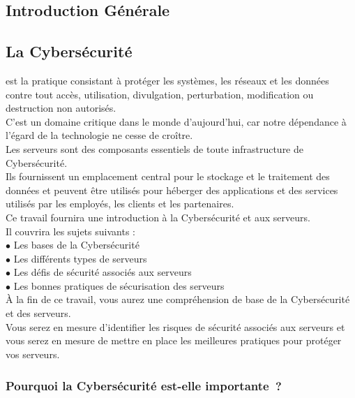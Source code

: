 	\begin{Huge}
		\chapter{ Introduction Générale}
	\end{Huge}
 \paragraph{ }
\section{La Cybersécurité }
 est la pratique consistant à protéger les systèmes, les réseaux et les données contre tout accès, utilisation, divulgation, perturbation, modification ou destruction non autorisés.\\
 C'est un domaine critique dans le monde d’aujourd’hui, car notre dépendance à l'égard de la technologie ne cesse de croître.\\

Les serveurs sont des composants essentiels de toute infrastructure de Cybersécurité.\\
 Ils fournissent un emplacement central pour le stockage et le traitement des données et peuvent être utilisés pour héberger des applications et des services utilisés par les employés, les clients et les partenaires.\\

Ce travail fournira une introduction à la Cybersécurité et aux serveurs.\\
 Il couvrira les sujets suivants :\\

$\bullet$ Les bases de la Cybersécurité\\
$\bullet$ Les différents types de serveurs\\
$\bullet$ Les défis de sécurité associés aux serveurs\\
$\bullet$ Les bonnes pratiques de sécurisation des serveurs\\

À la fin de ce travail, vous aurez une compréhension de base de la Cybersécurité et des serveurs.\\ Vous serez en mesure d'identifier les risques de sécurité associés aux serveurs et vous serez en mesure de mettre en place les meilleures pratiques pour protéger vos serveurs.\\

 \paragraph{ } \subsection{ Pourquoi la Cybersécurité est-elle importante ? }   

